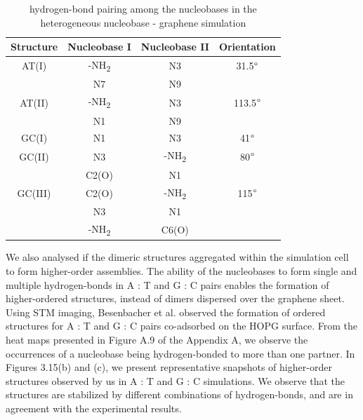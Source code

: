     \begin{table}
        \centering
        \caption[hydrogen-bond pairing among the nucleobases in the heterogeneous nucleobase - graphene simulation]{hydrogen-bond pairing among the nucleobases in the heterogeneous nucleobase - graphene simulation}
        \begin{tabular}{cccc}
            \toprule
            Structure   &   Nucleobase I            &   Nucleobase II           &   Orientation     \\   \midrule
            AT(I)       &   -NH\textsubscript{2}    &   N3                      &   31.5$\degree$   \\
                        &   N7                      &   N9                                          \\
            AT(II)      &   -NH\textsubscript{2}    &   N3                      &   113.5$\degree$  \\
                        &   N1                      &   N9                                          \\  
            GC(I)       &   N1                      &   N3                      &   41$\degree$     \\
            GC(II)      &   N3                      &   -NH\textsubscript{2}    &   80$\degree$     \\
                        &   C2(O)                   &   N1                                          \\
            GC(III)     &   C2(O)                   &   -NH\textsubscript{2}    &   115$\degree$    \\
                        &   N3                      &   N1                                          \\
                        &   -NH\textsubscript{2}    &   C6(O)                                       \\  \bottomrule
        \end{tabular}
    \end{table}

    We also analysed if the dimeric structures aggregated within the simulation cell to form higher-order assemblies. The ability of the nucleobases to form single and multiple hydrogen-bonds in A : T and G : C pairs enables the formation of higher-ordered structures, instead of dimers dispersed over the graphene sheet. Using STM imaging, Besenbacher et al. observed the formation of ordered structures for A : T and G : C pairs co-adsorbed on the HOPG surface.\supercite{mamdouh_supramolecular_2006,xu_coadsorption_2006} From the heat maps presented in Figure A.9 of the Appendix A, we observe the occurrences of a nucleobase being hydrogen-bonded to more than one partner. In Figures 3.15(b) and (c), we present representative snapshots of higher-order structures observed by us in A : T and G : C simulations. We observe that the structures are stabilized by different combinations of hydrogen-bonds, and are in agreement with the experimental results.


